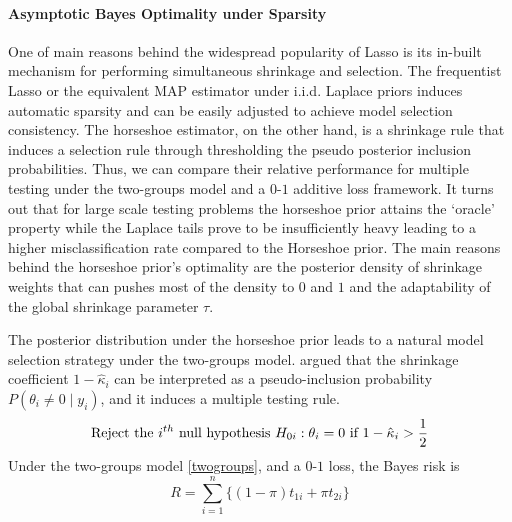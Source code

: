 \documentclass[11pt]{article}
\begin{document}

\paragraph{Asymptotic Bayes Optimality under Sparsity}

One of main reasons behind the widespread popularity of Lasso is its in-built mechanism for performing simultaneous shrinkage and selection. The frequentist Lasso or the equivalent MAP estimator under i.i.d. Laplace priors induces automatic sparsity and can be easily adjusted to achieve model selection consistency. The horseshoe estimator, on the other hand, is a shrinkage rule that induces a selection rule through thresholding the pseudo posterior inclusion probabilities. Thus, we can compare their relative performance for multiple testing under the two-groups model and a $0$-$1$ additive loss framework. It turns out that for large scale testing problems the horseshoe prior attains the `oracle' property while the Laplace tails prove to be insufficiently heavy leading to a higher misclassification rate compared to the Horseshoe prior. The main reasons behind the horseshoe prior's optimality are the posterior density of shrinkage weights that can pushes most of the density to $0$ and $1$ and the adaptability of the global shrinkage parameter $\tau$. 

The posterior distribution under the horseshoe prior leads to a natural model selection strategy under the two-groups model. \citet{carvalho2010horseshoe} argued that the shrinkage coefficient $1-\hat{\kappa}_i$ can be interpreted as a pseudo-inclusion probability $P(\theta_i \ne 0 \mid y_i)$, and it induces a multiple testing rule.
\begin{equation}
\text{Reject the $i^{th}$ null hypothesis } H_{0i} : \theta_i = 0 \text{ if } 1-\hat{\kappa}_i > \frac{1}{2} \label{eq:hsrule}
\end{equation}
Under the two-groups model \eqref{twogroups}, and a $0$-$1$ loss, the Bayes risk is 
\[
R = \sum_{i=1}^{n} \{ (1- \pi) t_{1i} + \pi t_{2i} \}
\]
\end{document}
